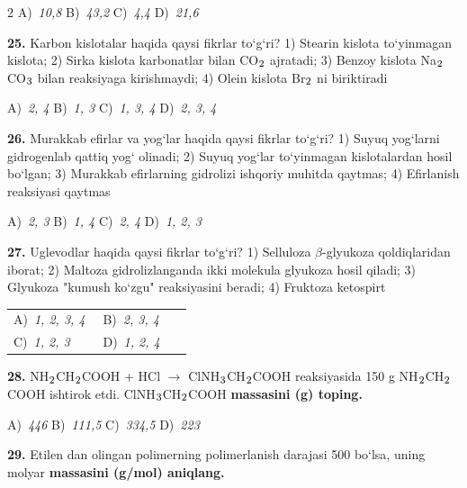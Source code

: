 \documentclass[11pt,a4paper]{article}
\renewcommand{\textsubscript}[1]{\ensuremath{_{\text{\fontsize{8}{8}\selectfont #1}}}}
\begin{document}
\begin{multicols}{2}
\noindent A)~\textsl{10,8} \hfill B)~\textsl{43,2} \hfill C)~\textsl{4,4} \hfill D)~\textsl{21,6}\par
\vspace{4pt}
\noindent\textbf{25.} Karbon kislotalar haqida qaysi fikrlar to`g`ri? 1) Stearin kislota to`yinmagan kislota; 2) Sirka kislota karbonatlar bilan CO\textsubscript{2} ajratadi; 3) Benzoy kislota Na\textsubscript{2}CO\textsubscript{3} bilan reaksiyaga kirishmaydi; 4) Olein kislota Br\textsubscript{2} ni biriktiradi

\noindent A)~\textsl{2, 4} \hfill B)~\textsl{1, 3} \hfill C)~\textsl{1, 3, 4} \hfill D)~\textsl{2, 3, 4}\par
\vspace{4pt}
\noindent\textbf{26.} Murakkab efirlar va yog`lar haqida qaysi fikrlar to`g`ri? 1) Suyuq yog`larni gidrogenlab qattiq yog` olinadi; 2) Suyuq yog`lar to`yinmagan kislotalardan hosil bo`lgan; 3) Murakkab efirlarning gidrolizi ishqoriy muhitda qaytmas; 4) Efirlanish reaksiyasi qaytmas

\noindent A)~\textsl{2, 3} \hfill B)~\textsl{1, 4} \hfill C)~\textsl{2, 4} \hfill D)~\textsl{1, 2, 3}\par
\vspace{4pt}
\noindent\textbf{27.} Uglevodlar haqida qaysi fikrlar to`g`ri? 1) Selluloza $\beta$-glyukoza qoldiqlaridan iborat; 2) Maltoza gidrolizlanganda ikki molekula glyukoza hosil qiladi; 3) Glyukoza "kumush ko`zgu" reaksiyasini beradi; 4) Fruktoza ketospirt

\noindent\begin{tabular}{@{}p{0.47\linewidth}@{}p{0.47\linewidth}@{}}
A)~\textsl{1, 2, 3, 4} & B)~\textsl{2, 3, 4} \\
C)~\textsl{1, 2, 3} & D)~\textsl{1, 2, 4} \\
\end{tabular}\par
\vspace{4pt}
\noindent\textbf{28.} NH\textsubscript{2}CH\textsubscript{2}COOH + HCl $\to$ ClNH\textsubscript{3}CH\textsubscript{2}COOH reaksiyasida 150 g NH\textsubscript{2}CH\textsubscript{2}COOH ishtirok etdi. ClNH\textsubscript{3}CH\textsubscript{2}COOH \textbf{massasini (g) toping.}

\noindent A)~\textsl{446} \hfill B)~\textsl{111,5} \hfill C)~\textsl{334,5} \hfill D)~\textsl{223}\par
\vspace{4pt}
\noindent\textbf{29.} Etilen dan olingan polimerning polimerlanish darajasi 500 bo`lsa, uning molyar \textbf{massasini (g/mol) aniqlang.}


\end{multicols}
\end{document}
